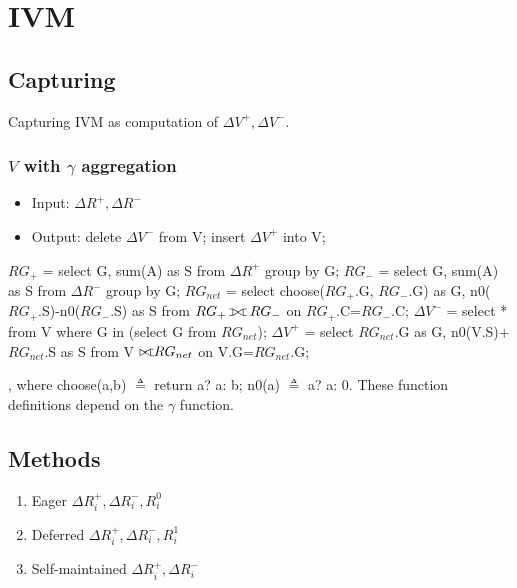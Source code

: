 \documentclass[a4paper]{report}
\def\ojoin{\setbox0=\hbox{$\bowtie$}%
  \rule[-.02ex]{.25em}{.4pt}\llap{\rule[\ht0]{.25em}{.4pt}}}
\def\rightouterjoin{\mathbin{\bowtie\mkern-5.8mu\ojoin}}
\def\fullouterjoin{\mathbin{\ojoin\mkern-5.8mu\bowtie\mkern-5.8mu\ojoin}}
\begin{document}
\section{IVM}
\subsection{Capturing}
Capturing IVM as computation of $\Delta V^+, \Delta V^-$. 

\subsubsection{$V$ with $\gamma$ aggregation}
\begin{itemize}
\item Input: $\Delta R^+, \Delta R^-$
\item Output: delete $\Delta V^-$ from V; insert $\Delta V^+$ into V;
\end{itemize}

\begin{pseudo}
$RG_+$ = select G, sum(A) as S from $\Delta R^+$ group by G;
$RG_-$ = select G, sum(A) as S from $\Delta R^-$ group by G;
$RG_{net}$ = select choose($RG_+$.G, $RG_-$.G) as G, n0($RG_+$.S)-n0($RG_-$.S) as S
         from $RG_+ \fullouterjoin RG_-$ on $RG_+$.C=$RG_-$.C;
$\Delta V^-$ = select * from V where G in (select G from $RG_{net}$);
$\Delta V^+$ = select $RG_{net}$.G as G, n0(V.S)+$RG_{net}$.S as S
        from V $\rightouterjoin RG_{net}$ on V.G=$RG_{net}$.G;
\end{pseudo}

, where choose(a,b) $\triangleq$ return a? a: b; n0(a) $\triangleq$ a? a: 0. These function definitions depend on the $\gamma$ function.
\subsection{Methods}
\begin{enumerate}
\item Eager $\Delta R_i^+, \Delta R_i^-, R_i^0$
\item Deferred $\Delta R_i^+, \Delta R_i^-, R_i^1$
\item Self-maintained $\Delta R_i^+, \Delta R_i^-$
\end{enumerate}
\end{document}
